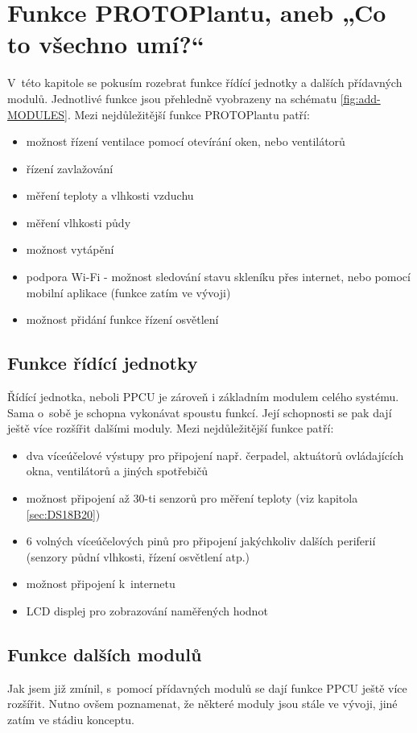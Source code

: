\chapter{Funkce PROTOPlantu, aneb „Co to všechno umí?“}
V~této kapitole se pokusím rozebrat funkce řídící jednotky a dalších přídavných modulů.
Jednotlivé funkce jsou přehledně vyobrazeny na schématu \ref{fig:add-MODULES}.
Mezi nejdůležitější funkce PROTOPlantu patří:
\begin{itemize}
    \item možnost řízení ventilace pomocí otevírání oken, nebo ventilátorů
    \item řízení zavlažování
    \item měření teploty a vlhkosti vzduchu
    \item měření vlhkosti půdy
    \item možnost vytápění
    \item podpora Wi-Fi - možnost sledování stavu skleníku přes internet, nebo pomocí mobilní aplikace (funkce zatím ve vývoji)
    \item možnost přidání funkce řízení osvětlení
\end{itemize}

\section{Funkce řídící jednotky}
Řídící jednotka, neboli PPCU je zároveň i základním modulem celého systému.
Sama o~sobě je schopna vykonávat spoustu funkcí.
Její schopnosti se pak dají ještě více rozšířit dalšími moduly.
Mezi nejdůležitější funkce patří:
\begin{itemize}
    \item dva víceúčelové výstupy pro připojení např. čerpadel, aktuátorů ovládajících okna, ventilátorů a jiných spotřebičů
    \item možnost připojení až 30-ti senzorů pro měření teploty (viz kapitola \ref{sec:DS18B20})
    \item 6 volných víceúčelových pinů pro připojení jakýchkoliv dalších periferií (senzory půdní vlhkosti, řízení osvětlení atp.)
    \item možnost připojení k~internetu
    \item LCD displej pro zobrazování naměřených hodnot
\end{itemize}

\section{Funkce dalších modulů}
Jak jsem již zmínil, s~pomocí přídavných modulů se dají funkce PPCU ještě více rozšířit.
Nutno ovšem poznamenat, že některé moduly jsou stále ve vývoji, jiné zatím ve stádiu konceptu.
\newline

